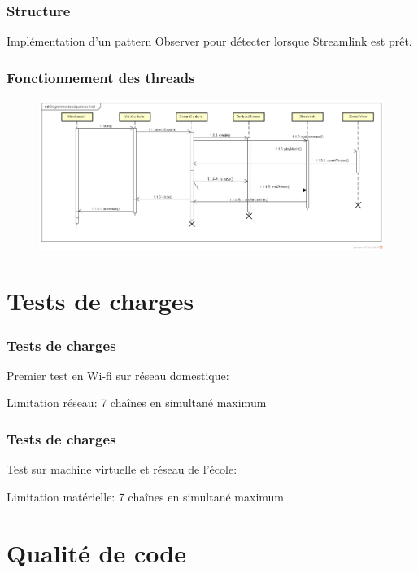 \documentclass{beamer}
\begin{document}
\begin{frame}
\frametitle{Structure}

Implémentation d'un pattern Observer pour détecter lorsque Streamlink est prêt. 

\end{frame}


\begin{frame}
\frametitle{Fonctionnement des threads}

\begin{figure}
	\includegraphics[scale=0.25]{images/seqdiag}
\end{figure}

\end{frame}


\section{Tests de charges}

\begin{frame}
\frametitle{Tests de charges}

Premier test en Wi-fi sur réseau domestique:

Limitation réseau: 7 chaînes en simultané maximum

\end{frame}

\begin{frame}
\frametitle{Tests de charges}

Test sur machine virtuelle et réseau de l'école:

Limitation matérielle: 7 chaînes en simultané maximum

\end{frame}



\section{Qualité de code}
\end{document}
